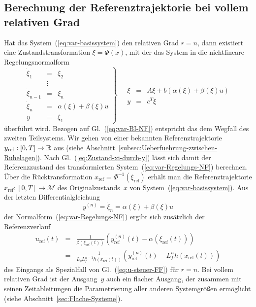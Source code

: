 \subsection{Berechnung der Referenztrajektorie bei vollem relativen Grad\label{subsec:Berechnung-Referenztraj-flach}}

Hat das System~(\ref{eq:var-basissystem}) den relativen Grad $r=n$,
dann existiert eine Zustands\-transformation $\xi=\Phi(x)$, mit
der das System in die nichtlineare Regelungsnormalform
\begin{equation}
\left.\begin{array}{lcl}
\dot{\xi}_{1} & = & \xi_{2}\\
 & \vdots\\
\dot{\xi}_{n-1} & = & \xi_{n}\\
\dot{\xi}_{n} & = & \alpha(\xi)+\beta(\xi)u\\
y & = & \xi_{1}
\end{array}\right\} \quad\begin{array}{rcl}
\dot{\xi} & = & A\xi+b(\alpha(\xi)+\beta(\xi)u)\\
y & = & c^{T}\xi
\end{array}\label{eq:var-Regelungs-NF}
\end{equation}
überführt wird. Bezogen auf Gl.~(\ref{eq:var-BI-NF}) entspricht
das dem Wegfall des zweiten Teilsystems. Wir gehen von einer bekannten
Referenztrajektorie $y_{\text{ref}}:[0,T]\to{\mathbb{R}}$ aus (siehe Abschnitt~\ref{subsec:Ueberfuehrung-zwischen-Ruhelagen}).
Nach Gl.~(\ref{eq:Zustand-xi-durch-y}) lässt sich damit der Referenzzustand
des transformierten System~(\ref{eq:var-Regelungs-NF}) berechnen.
Über die Rücktransformation $x_{\text{ref}}=\Phi^{-1}(\xi_{\text{ref}})$
erhält man die Referenztrajektorie $x_{\text{ref}}:[0,T]\to\mathcal{M}$
des Originalzustands~$x$ von System~(\ref{eq:var-basissystem}).
Aus der letzten Differentialgleichung 
\[
y^{(n)}=\dot{\xi}_{n}=\alpha(\xi)+\beta(\xi)u
\]
der Normalform~(\ref{eq:var-Regelungs-NF}) ergibt sich zusätzlich
der Referenzverlauf
\begin{equation}
\begin{array}{lcl}
u_{\text{ref}}(t) & = & \frac{1}{\beta(\xi_{\text{ref}}(t))}\left(y_{\text{ref}}^{(n)}(t)-\alpha(\xi_{\text{ref}}(t))\right)\\
 & = & \frac{1}{L_{g}L_{f}^{n-1}h(x_{\text{ref}}(t))}\left(y_{\text{ref}}^{(n)}(t)-L_{f}^{n}h(x_{\text{ref}}(t))\right)
\end{array}\label{eq:uref-feedforward-n}
\end{equation}
des Eingangs als Spezialfall von Gl.~(\ref{eq:u-steuer-FF}) für
$r=n$. Bei vollem relativen Grad ist der Ausgang~$y$ auch ein flacher
Ausgang, der zusammen mit seinen Zeitableitungen die Parametrierung
aller anderen System\-größen ermöglicht (siehe Abschnitt~\ref{sec:Flache-Systeme}). 

